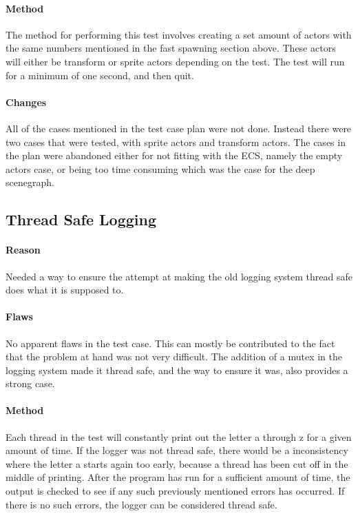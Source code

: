 \paragraph{Method}
The method for performing this test involves creating a set amount of actors with the same numbers mentioned in the fast spawning section above.
These actors will either be transform or sprite actors depending on the test.
The test will run for a minimum of one second, and then quit.

\paragraph{Changes}
All of the cases mentioned in the test case plan were not done.
Instead there were two cases that were tested, with sprite actors and transform actors.
The cases in the plan were abandoned either for not fitting with the ECS, namely the empty actors case, or being too time consuming which was the case for the deep scenegraph.

\subsection{Thread Safe Logging}
\paragraph{Reason}
Needed a way to ensure the attempt at making the old logging system thread safe does what it is supposed to.

\paragraph{Flaws}
No apparent flaws in the test case.
This can mostly be contributed to the fact that the problem at hand was not very difficult.
The addition of a mutex in the logging system made it thread safe, and the way to ensure it was, also provides a strong case.

\paragraph{Method}
Each thread in the test will constantly print out the letter a through z for a given amount of time.
If the logger was not thread safe, there would be a inconsistency where the letter a starts again too early, because a thread has been cut off in the middle of printing.
After the program has run for a sufficient amount of time, the output is checked to see if any such previously mentioned errors has occurred.
If there is no such errors, the logger can be considered thread safe.

